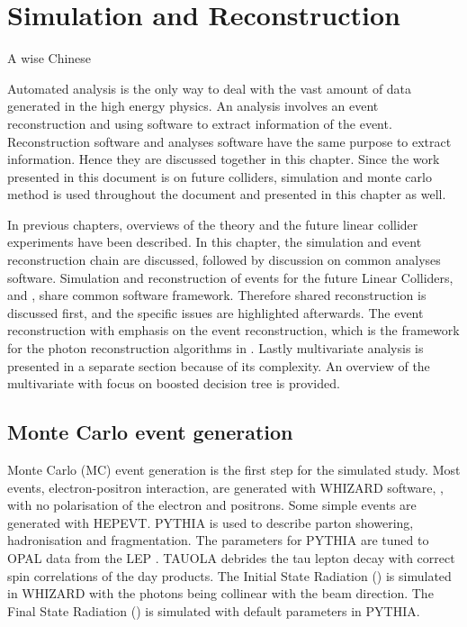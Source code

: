 \chapter{Simulation and Reconstruction}
\label{chap:Reconstruction}

%
{A wise Chinese}%


Automated analysis is the only way to deal with the vast amount of data generated in the high energy physics. An analysis involves an event reconstruction and using software to extract information of the event. Reconstruction software and analyses software have the same purpose to extract information. Hence they are discussed together in this chapter. Since the work presented in this document is on future colliders, simulation and monte carlo method is used throughout the document and presented in this chapter as well.

In previous chapters, overviews of the theory and the future linear collider experiments have been described. In this chapter, the simulation and event reconstruction chain are discussed, followed by  discussion on  common analyses software. Simulation and reconstruction of events for the future Linear Colliders, \ILC and \CLIC, share common software framework.  Therefore shared reconstruction is discussed first, and the \CLIC specific issues are highlighted afterwards. The event reconstruction with emphasis on the \pandora event reconstruction, which is the framework for the photon reconstruction algorithms in . Lastly multivariate analysis is presented in a separate section because of its complexity. An overview of the multivariate with focus on boosted decision tree is provided.


\section{Monte Carlo event generation}

Monte Carlo (MC) event generation is the first step for the simulated study. Most events, electron-positron interaction, are generated with WHIZARD software, \cite{whizard,Moretti:2001zz}, with no polarisation of the electron and positrons. Some simple events are generated with HEPEVT. PYTHIA \cite{Sjostrand:1995iq} is used to describe parton showering, hadronisation and fragmentation. The parameters for PYTHIA are tuned to OPAL data from the LEP \cite{Alexander:1995bk}. TAUOLA \cite{Jadach:1993hs} debrides the tau lepton decay with correct spin correlations of the day products. The Initial State Radiation (\ISR) is simulated in WHIZARD with the \ISR photons being collinear with the beam direction. The Final State Radiation (\FSR) is simulated with default parameters in PYTHIA.

